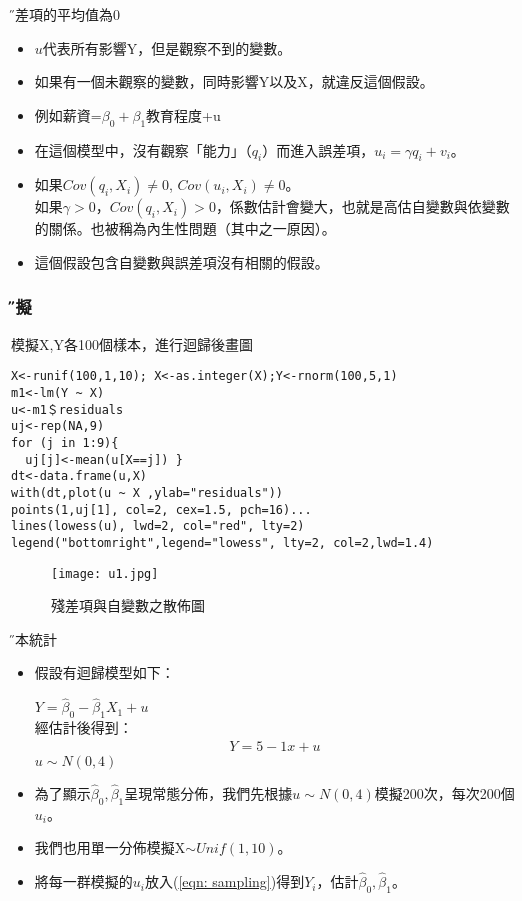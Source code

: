 \documentclass[xcolor=dvipsnames]{beamer}
\begin{document}
\begin{frame} {\H 誤差項的平均值為0}
\begin{itemize}
\item $ u $代表所有影響Y，但是觀察不到的變數。\\
\item 如果有一個未觀察的變數，同時影響Y以及X，就違反這個假設。
\item 例如薪資=$\beta_{0}+\beta_{1}$教育程度+u
\item 在這個模型中，沒有觀察「能力」（$q_{i}$）而進入誤差項，$u_{i}=\gamma q_{i}+v_{i}$。
\item 如果$ Cov(q_{i},X_{i})\neq 0$, $ Cov(u_{i},X_{i})\neq 0$。 \\
如果$ \gamma>0 $，$ Cov(q_{i},X_{i})> 0$，係數估計會變大，也就是高估自變數與依變數的關係。也被稱為內生性問題（其中之一原因）。
\item 這個假設包含自變數與誤差項沒有相關的假設。
\end{itemize}
\end{frame}
\begin{frame}[fragile=singleslide]\frametitle{\H 模擬}
模擬X,Y各100個樣本，進行迴歸後畫圖
\begin{Verbatim}[frame=single,label=R code,
formatcom=\color{blue},fontseries=b,xleftmargin=2mm]
X<-runif(100,1,10); X<-as.integer(X);Y<-rnorm(100,5,1)
m1<-lm(Y ~ X)
u<-m1＄residuals
uj<-rep(NA,9)
for (j in 1:9){
  uj[j]<-mean(u[X==j]) }
dt<-data.frame(u,X)
with(dt,plot(u ~ X ,ylab="residuals"))
points(1,uj[1], col=2, cex=1.5, pch=16)...
lines(lowess(u), lwd=2, col="red", lty=2)
legend("bottomright",legend="lowess", lty=2, col=2,lwd=1.4)
\end{Verbatim}
\end{frame}
\begin{frame}
\begin{figure}
\texttt{[image: u1.jpg]}
\caption{殘差項與自變數之散佈圖}
\end{figure}
\end{frame}
\begin{frame}{\H 樣本統計}
\begin{itemize}
\item 假設有迴歸模型如下：
\begin{center}
$Y=\hat{\beta}_{0} - \hat{\beta}_{1}X_{1}+u$\\
\hspace{-16em}經估計後得到：\\
\begin{align}
Y=5 - 1x+u
\label{eqn: sampling}
\end{align}
$ u\sim N(0,4) $
\end{center}
\item 為了顯示$ \hat{\beta}_{0}, \hat{\beta}_{1} $呈現常態分佈，我們先根據$ u\sim N(0,4) $模擬200次，每次200個$u_{i}$。
\item 我們也用單一分佈模擬X$\sim  Unif(1,10)$。
\item 將每一群模擬的$u_{i}$放入(\ref{eqn: sampling})得到$Y_{i}$，估計$ \hat{\beta}_{0}, \hat{\beta}_{1} $。
\end{itemize}
\end{frame}
\end{document}
